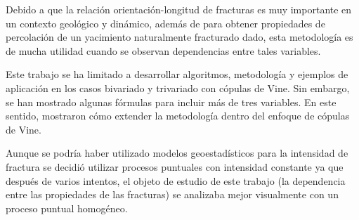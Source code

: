 Debido a que la relaci\'on orientaci\'on-longitud de fracturas es muy importante en un contexto geol\'ogico y din\'amico, adem\'as de para obtener propiedades de percolaci\'on de un yacimiento naturalmente fracturado dado, esta metodolog\'ia es de mucha utilidad cuando se observan dependencias entre tales variables.

Este trabajo se ha limitado a desarrollar algoritmos, metodolog\'ia y ejemplos de aplicaci\'on en los casos bivariado y trivariado con c\'opulas de Vine. Sin embargo, se han mostrado algunas f\'ormulas para incluir m\'as de tres variables. En este sentido, \cite{weis_smooth_2012} mostraron c\'omo extender la metodolog\'ia dentro del enfoque de c\'opulas de Vine.


Aunque se podr\'ia haber utilizado modelos geoestad\'isticos para la intensidad de fractura se decidi\'o utilizar procesos puntuales con intensidad constante ya que despu\'es de varios intentos, el objeto de estudio de este trabajo (la dependencia entre las propiedades de las fracturas) se analizaba mejor visualmente con un proceso puntual homog\'eneo.

